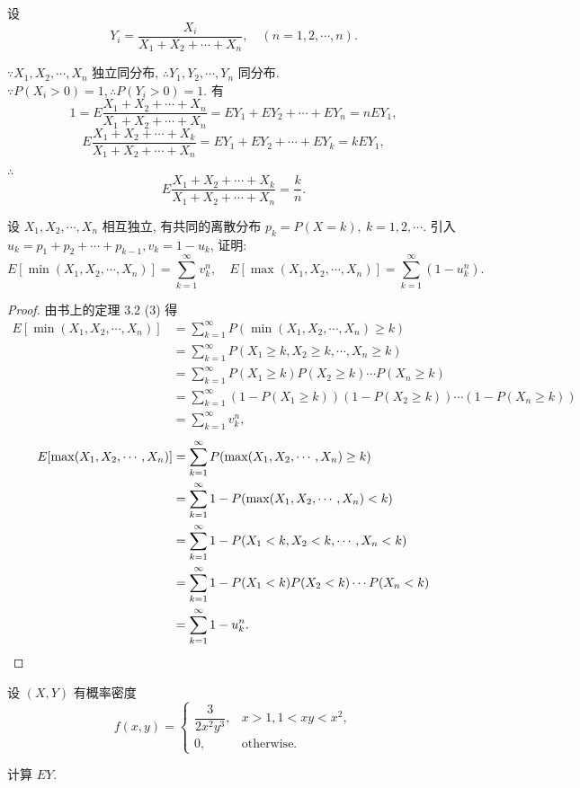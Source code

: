 \documentclass{ctexart}
\begin{document}
\begin{solution}
    设
    \[Y_i=\dfrac{X_i}{X_1+X_2+\cdots+X_n},\quad (n=1,2,\cdots,n).\]
    
    $\because X_1,X_2,\cdots,X_n$ 独立同分布, $\therefore Y_1,Y_2,\cdots,Y_n$ 同分布. $\because P(X_i>0)=1,\therefore P(Y_i>0)=1$. 有
    \[1=E\dfrac{X_1+X_2+\cdots+X_n}{X_1+X_2+\cdots+X_n}=EY_1+EY_2+\cdots+EY_n=nEY_1,\]
    \[E\dfrac{X_1+X_2+\cdots+X_k}{X_1+X_2+\cdots+X_n}=EY_1+EY_2+\cdots+EY_k=kEY_1,\]

    $\therefore$
    \[E\dfrac{X_1+X_2+\cdots+X_k}{X_1+X_2+\cdots+X_n}=\dfrac{k}{n}.\]
\end{solution}
\addtocounter{exercise}{2}
\begin{exercise}%
    设 $X_1,X_2,\cdots,X_n$ 相互独立, 有共同的离散分布 $p_k=P(X=k),\ k=1,2,\cdots$. 引入 $u_k=p_1+p_2+\cdots+p_{k-1},v_k=1-u_k$, 证明:
    \[E[\min(X_1,X_2,\cdots,X_n)]=\sum\limits_{k=1}^\infty v_k^n,\quad E[\max(X_1,X_2,\cdots,X_n)]=\sum\limits_{k=1}^\infty(1-u_k^n).\]
\end{exercise}
\begin{proof}
    由书上的定理 3.2 (3) 得
    \begin{align*}
        E[\min(X_1,X_2,\cdots,X_n)] & =\sum\limits_{k=1}^\infty P(\min(X_1,X_2,\cdots,X_n)\geq k) \\
        & =\sum\limits_{k=1}^\infty P(X_1\geq k,X_2\geq k,\cdots,X_n\geq k) \\
        & =\sum\limits_{k=1}^\infty P(X_1\geq k)P(X_2\geq k)\cdots P(X_n\geq k) \\
        & =\sum\limits_{k=1}^\infty (1-P(X_1\geq k))(1-P(X_2\geq k))\cdots(1-P(X_n\geq k)) \\
        & =\sum\limits_{k=1}^\infty v_k^n,
    \end{align*}
    \begin{align*}
        E[\max(X_1,X_2,\cdots,X_n)] & =\sum\limits_{k=1}^\infty P(\max(X_1,X_2,\cdots,X_n)\geq k) \\
        & =\sum\limits_{k=1}^\infty1-P(\max(X_1,X_2,\cdots,X_n)<k) \\
        & =\sum\limits_{k=1}^\infty1-P(X_1<k,X_2<k,\cdots,X_n<k) \\
        & =\sum\limits_{k=1}^\infty1-P(X_1<k)P(X_2<k)\cdots P(X_n<k) \\
        & =\sum\limits_{k=1}^\infty1-u_k^n.\qedhere
    \end{align*}
\end{proof}
\begin{exercise}[1]%
    设 $(X,Y)$ 有概率密度
    \[f(x,y)=\begin{cases}
        \dfrac{3}{2x^2y^3}, & x>1,1<xy<x^2, \\[6pt]
        0, & \text{otherwise}.
    \end{cases}\]

    计算 $EY$.
\end{exercise}
\end{document}
